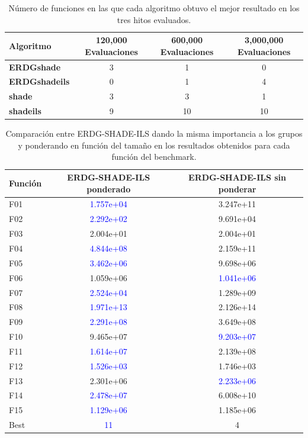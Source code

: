 \begin{table}[h]
\centering

\begin{tabular}{lccc}
\toprule
\textbf{Algoritmo} & \textbf{120,000 Evaluaciones} & \textbf{600,000 Evaluaciones} & \textbf{3,000,000 Evaluaciones} \\
\midrule
\textbf{ERDGshade}    &  3 &  1 &  0 \\
\textbf{ERDGshadeils} &  0 &  1 &  4 \\
\textbf{shade}        &  3 &  3 &  1 \\
\textbf{shadeils}     &  9 &  10 &  10 \\
\bottomrule
\end{tabular}
\caption{Número de funciones en las que cada algoritmo obtuvo el mejor resultado en los tres hitos evaluados.}
\label{tab:resultados_comparativos_erdg_shade}
\end{table}

\begin{table}[h]
\centering
\begin{tabular}{lcc}
\toprule
\textbf{Función} & \textbf{ERDG-SHADE-ILS ponderado} & \textbf{ERDG-SHADE-ILS sin ponderar} \\
\midrule
F01  &  \textcolor{blue}{1.757e+04} &  3.247e+11 \\
F02  &  \textcolor{blue}{2.292e+02} &  9.691e+04 \\
F03  &  2.004e+01 &  2.004e+01 \\
F04  &  \textcolor{blue}{4.844e+08} &  2.159e+11 \\
F05  &  \textcolor{blue}{3.462e+06} &  9.698e+06 \\
F06  &  1.059e+06 &  \textcolor{blue}{1.041e+06} \\
F07  &  \textcolor{blue}{2.524e+04} &  1.289e+09 \\
F08  &  \textcolor{blue}{1.971e+13} &  2.126e+14 \\
F09  &  \textcolor{blue}{2.291e+08} &  3.649e+08 \\
F10  &  9.465e+07 &  \textcolor{blue}{9.203e+07} \\
F11  &  \textcolor{blue}{1.614e+07} &  2.139e+08 \\
F12  &  \textcolor{blue}{1.526e+03} &  1.746e+03 \\
F13  &  2.301e+06 &  \textcolor{blue}{2.233e+06} \\
F14  &  \textcolor{blue}{2.478e+07} &  6.008e+10 \\
F15  &  \textcolor{blue}{1.129e+06} &  1.185e+06 \\
Best &           \textcolor{blue}{11} &              4 \\
\bottomrule
\end{tabular}
\caption{Comparación entre ERDG-SHADE-ILS dando la misma importancia a los grupos y ponderando en función del tamaño en los resultados obtenidos para cada función del benchmark.}
\label{tab:comparacion_erdg_shadeils}
\end{table}

